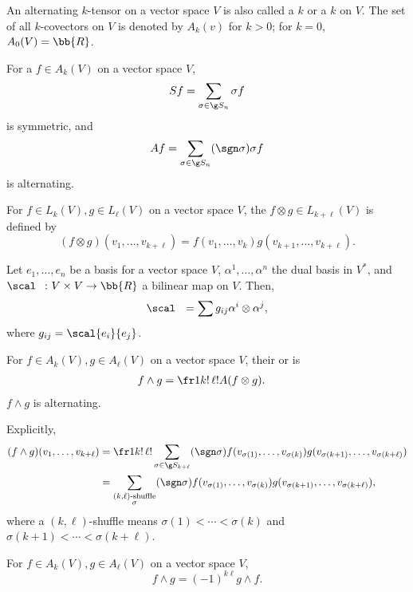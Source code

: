 An alternating $k$-tensor on a vector space $V$ is also called a $k$ or a  $k$ on $V$. The set of all $k$-covectors on $V$ is denoted by $A_k(v)$ for $k > 0$; for $k = 0$, $A_0 (V) = \bb{R}$.

For a $f \in A_k(V)$ on a vector space $V$,
\[
 Sf = \sum_{\sigma \in \g S_n} \sigma f
\]
is symmetric, and
\[
 Af = \sum_{\sigma \in \g S_n} (\sgn \sigma) \sigma f
\]
is alternating.

For $f \in L_k(V), g \in L_\ell(V)$ on a vector space $V$, the  $f \otimes g \in L_{k+\ell}(V)$ is defined by
\[
(f \otimes g) (v_1, \dotsc, v_{k+\ell}) = f(v_1,\dotsc,v_k)g(v_{k+1},\dotsc,v_{k+\ell}).
\]

Let $e_1,\dotsc,e_n$ be a basis for a vector space $V$, $\alpha^1,\dotsc,\alpha^n$ the dual basis in $V^*$, and $\scal\ \  \colon V \times V \to \bb{R}$ a bilinear map on $V$. Then,
\[
\scal\ \  = \sum g_{ij} \alpha^i \otimes \alpha^j,
\]
where $g_{ij} = \scal{e_i}{e_j}$.

For $f \in A_k(V), g \in A_\ell(V)$ on a vector space $V$, their  or  is
\begin{align*}
f \wedge g &= \fr1{k!\, \ell!} A( f \otimes g).
\end{align*}
$f \wedge g$ is alternating.

Explicitly,
\begin{align*}
(f \wedge g) (v_1,\dotsc,v_{k+\ell}) &= \fr1{k!\,\ell!} \sum_{\sigma \in \g S_{k+\ell}} (\sgn \sigma)f(v_{\sigma(1)},\dotsc,v_{\sigma(k)}) g(v_{\sigma(k+1)},\dotsc,v_{\sigma(k+\ell)}) \\
&= \sum_{\substack{(k,\ell)\text{-shuffle}\\ \sigma}} (\sgn \sigma) f(v_{\sigma(1)},\dotsc,v_{\sigma(k)}) g(v_{\sigma(k+1)},\dotsc,v_{\sigma(k+\ell)}),
\end{align*}
where a $(k,\ell)$-shuffle means $\sigma(1)<\dotsb<\sigma(k)$ and $\sigma(k+1)<\dotsb < \sigma(k+\ell)$.

For $f \in A_k (V), g \in A_\ell(V)$ on a vector space $V$,
\[
f \wedge g = (-1)^{k\ell} g \wedge f.
\]

